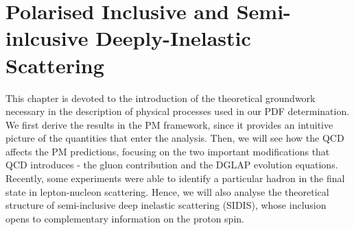 \chapter{Polarised Inclusive and Semi-inlcusive Deeply-Inelastic Scattering}
\label{ch:2}

This chapter is devoted to the introduction of the theoretical groundwork necessary in the description of physical processes used in our PDF determination. We first derive the results in the PM framework, since it provides an intuitive picture of the quantities that enter the analysis. Then, we will see how the QCD affects the PM predictions, focusing on the two important modifications that QCD introduces - the gluon contribution and the DGLAP evolution equations. Recently, some experiments were able to identify a particular hadron in the final state in lepton-nucleon scattering. Hence, we will also analyse the theoretical structure of semi-inclusive deep inelastic scattering (SIDIS), whose inclusion opens to complementary information on the proton spin.

